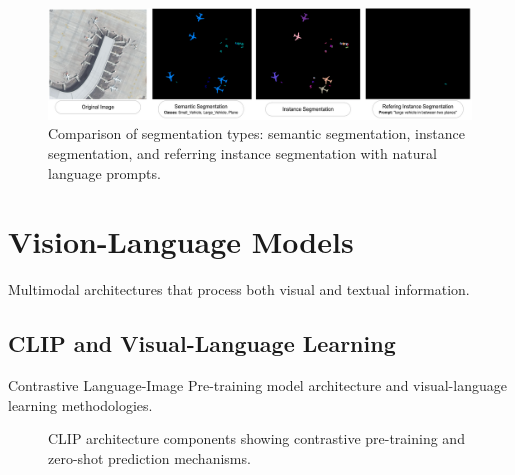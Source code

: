 \begin{figure}[htbp]
\centering
\includegraphics[width=1.0\textwidth]{Images/segmentation.png}
\caption{Comparison of segmentation types: semantic segmentation, instance segmentation, and referring instance segmentation with natural language prompts.}
\label{fig:segmentation}
\end{figure}

\section{Vision-Language Models}

Multimodal architectures that process both visual and textual information.

\subsection{CLIP and Visual-Language Learning}

Contrastive Language-Image Pre-training model architecture and visual-language learning methodologies.

\begin{figure}[htbp]
\centering
{}
\hfill
{}
\caption{CLIP architecture components showing contrastive pre-training and zero-shot prediction mechanisms.}
\label{fig:clip_architecture}
\end{figure}

